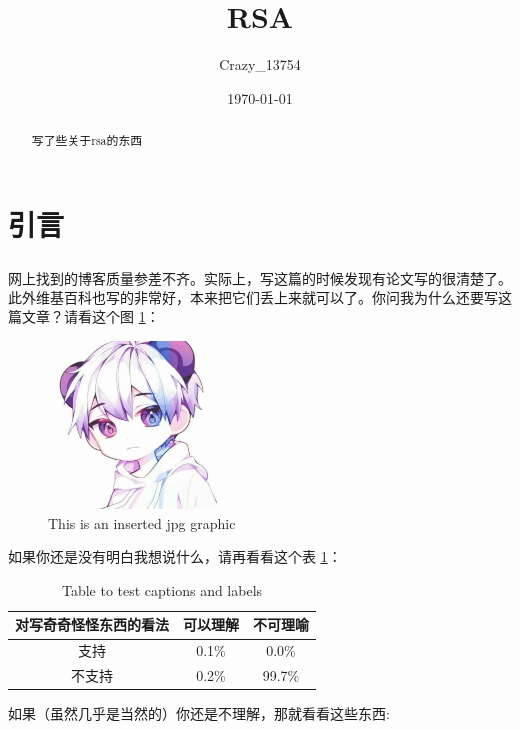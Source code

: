 \documentclass[a4paper]{article}  %
\title{\heiti\zihao{2} RSA}
\author{\songti Crazy\_13754}
\date{\today}
\newcommand{\upcite}[1]{\textsuperscript{\textsuperscript{\cite{#1}}}} %
\begin{document}
    \maketitle
\begin{abstract}
    写了些关于rsa的东西
\end{abstract}
\tableofcontents
\section[引言]{引言}

网上找到的博客质量参差不齐。实际上，写这篇的时候发现有论文写的很清楚了\upcite{chenchuanbo2006rsa}。此外维基百科也写的非常好，本来把它们丢上来就可以了。你问我为什么还要写这篇文章？请看这个图 \ref{fig:rsa1}：

\begin{figure}[htbp]
    \centering
    \includegraphics[width=1.77in,height=1.75in]{contents/rsa1.jpg}
    \caption{This is an inserted jpg graphic}
    \label{fig:rsa1}
    \end{figure}

如果你还是没有明白我想说什么，请再看看这个表 \ref{table:1}：

\begin{table}[h!]
    \centering
    \begin{tabular}{ c c c } 
        \hline
        对写奇奇怪怪东西的看法 & 可以理解 & 不可理喻 \\
        \hline
        支持 & 0.1\% & 0.0\% \\ 
        不支持 & 0.2\% & 99.7\% \\ 
        \hline
       \end{tabular}
    \caption{Table to test captions and labels}
    \label{table:1}
    \end{table}

如果（虽然几乎是当然的）你还是不理解，那就看看这些东西:
\end{document}
